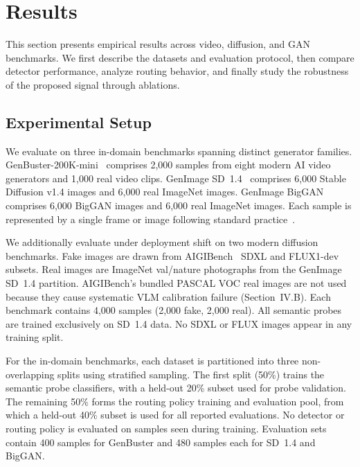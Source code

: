 \documentclass{ieeeaccess}
\begin{document}
\section{Results}

This section presents empirical results across video, diffusion, and GAN benchmarks. We first describe the datasets and evaluation protocol, then compare detector performance, analyze routing behavior, and finally study the robustness of the proposed signal through ablations.

\subsection{Experimental Setup}

We evaluate on three in-domain benchmarks spanning distinct generator families.
GenBuster-200K-mini~\cite{wen2025busterxmllmpoweredaigeneratedvideo} comprises 2{,}000
samples from eight modern AI video generators and 1{,}000 real video clips.
GenImage SD~1.4~\cite{NEURIPS2023_f4d4a021} comprises 6{,}000 Stable Diffusion v1.4
images and 6{,}000 real ImageNet images. GenImage
BigGAN~\cite{NEURIPS2023_f4d4a021} comprises 6{,}000 BigGAN images and 6{,}000 real
ImageNet images. Each sample is represented by a single frame or image following standard
practice~\cite{wen2025busterxmllmpoweredaigeneratedvideo}.

We additionally evaluate under deployment shift on two modern diffusion benchmarks.
Fake images are drawn from AIGIBench~\cite{li2025artificial} SDXL and FLUX1-dev
subsets. Real images are ImageNet val/nature photographs from the GenImage SD~1.4
partition. AIGIBench's bundled PASCAL VOC real images are not used because they
cause systematic VLM calibration failure (Section~IV.B). Each benchmark contains
4{,}000 samples (2{,}000 fake, 2{,}000 real). All semantic probes are trained
exclusively on SD~1.4 data. No SDXL or FLUX images appear in any training split.


For the in-domain benchmarks, each dataset is partitioned into three non-overlapping splits
using stratified sampling. The first split (50\%) trains the semantic probe classifiers,
with a held-out 20\% subset used for probe validation. The remaining 50\% forms the routing
policy training and evaluation pool, from which a held-out 40\% subset is used for all
reported evaluations. No detector or routing policy is evaluated on samples seen during
training. Evaluation sets contain 400 samples for GenBuster and 480 samples each for
SD~1.4 and BigGAN.
\end{document}
